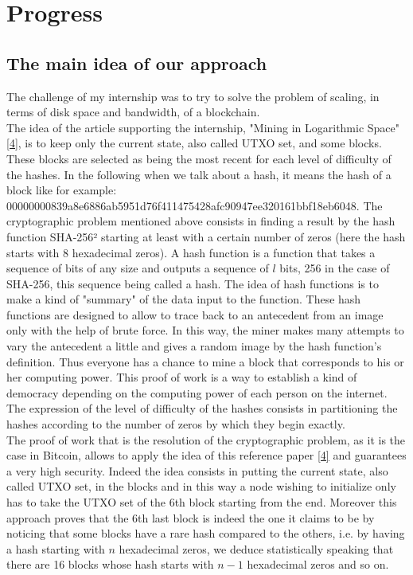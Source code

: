 \documentclass[12pt,a4paper]{article}
\newcommand{\source}[1]{\hyperlink{#1}{[#1]}}
\begin{document}
	\section{Progress}
	
	\subsection{The main idea of our approach}
	
	The challenge of my internship was to try to solve the problem of scaling, in terms of disk space and bandwidth, of a blockchain.\\
	The idea of the article supporting the internship, "Mining in Logarithmic Space" \source{4}, is to keep only the current state, also called UTXO set, and some blocks. These blocks are selected as being the most recent for each level of difficulty of the hashes. In the following when we talk about a hash, it means the hash of a block like for example:\\ 00000000839a8e6886ab5951d76f411475428afc90947ee320161bbf18eb6048. The cryptographic problem mentioned above consists in finding a result by the hash function SHA-256² starting at least with a certain number of zeros (here the hash starts with 8 hexadecimal zeros). A hash function is a function that takes a sequence of bits of any size and outputs a sequence of $l$ bits, 256 in the case of SHA-256, this sequence being called a hash. The idea of hash functions is to make a kind of "summary" of the data input to the function. These hash functions are designed to allow to trace back to an antecedent from an image only with the help of brute force. In this way, the miner makes many attempts to vary the antecedent a little and gives a random image by the hash function's definition. Thus everyone has a chance to mine a block that corresponds to his or her computing power. This proof of work is a way to establish a kind of democracy depending on the computing power of each person on the internet. The expression of the level of difficulty of the hashes consists in partitioning the hashes according to the number of zeros by which they begin exactly.\\
	The proof of work that is the resolution of the cryptographic problem, as it is the case in Bitcoin, allows to apply the idea of this reference paper \source{4} and guarantees a very high security. Indeed the idea consists in putting the current state, also called UTXO set, in the blocks and in this way a node wishing to initialize only has to take the UTXO set of the 6th block starting from the end. Moreover this approach proves that the 6th last block is indeed the one it claims to be by noticing that some blocks have a rare hash compared to the others, i.e. by having a hash starting with $n$ hexadecimal zeros, we deduce statistically speaking that there are 16 blocks whose hash starts with $n - 1$ hexadecimal zeros and so on.
	
\end{document}

